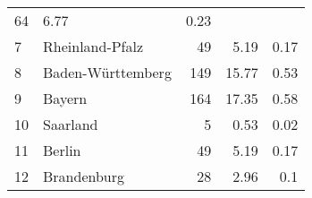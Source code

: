 \begin{longtable}{lXrrr}
       \num{64} &
       \num[round-mode=places,round-precision=2]{6,77} &
         \num[round-mode=places,round-precision=2]{0,23} \\

     7 &
     \multicolumn{1}{X}{ Rheinland-Pfalz   } &


       \num{49} &
       \num[round-mode=places,round-precision=2]{5,19} &
         \num[round-mode=places,round-precision=2]{0,17} \\

     8 &
     \multicolumn{1}{X}{ Baden-Württemberg   } &


       \num{149} &
       \num[round-mode=places,round-precision=2]{15,77} &
         \num[round-mode=places,round-precision=2]{0,53} \\

     9 &
     \multicolumn{1}{X}{ Bayern   } &


       \num{164} &
       \num[round-mode=places,round-precision=2]{17,35} &
         \num[round-mode=places,round-precision=2]{0,58} \\

     10 &
     \multicolumn{1}{X}{ Saarland   } &


       \num{5} &
       \num[round-mode=places,round-precision=2]{0,53} &
         \num[round-mode=places,round-precision=2]{0,02} \\

     11 &
     \multicolumn{1}{X}{ Berlin   } &


       \num{49} &
       \num[round-mode=places,round-precision=2]{5,19} &
         \num[round-mode=places,round-precision=2]{0,17} \\

     12 &
     \multicolumn{1}{X}{ Brandenburg   } &


       \num{28} &
       \num[round-mode=places,round-precision=2]{2,96} &
         \num[round-mode=places,round-precision=2]{0,1} \\


\end{longtable}
